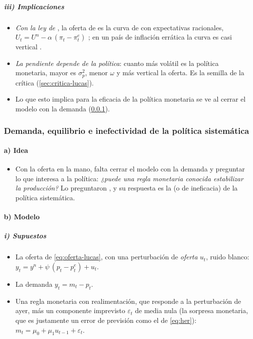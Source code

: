 \documentclass[11pt]{article}
\begin{document}
\subparagraph{iii) Implicaciones}

\begin{itemize}
\item \emph{Con la ley de }, la oferta de  es la curva de  con expectativas racionales, $U_t=U^n-\alpha\,(\pi_t-\pi^e_t)$ ; en un país de inflación errática la curva es casi vertical .
\item \emph{La pendiente depende de la política}: cuanto más volátil es la política monetaria, mayor es $\sigma^2_p$, menor $\omega$ y más vertical la oferta. Es la semilla de la crítica (\ref{sec:critica-lucas}).
\item Lo que esto implica para la eficacia de la política monetaria se ve al cerrar el modelo con la demanda (\ref{sec:inefectividad}).
\end{itemize}

\subsubsection{Demanda, equilibrio e inefectividad de la política sistemática}\label{sec:inefectividad}

\paragraph{a) Idea}

\begin{itemize}
\item Con la oferta en la mano, falta cerrar el modelo con la demanda y preguntar lo que interesa a la política: \emph{¿puede una regla monetaria conocida estabilizar la producción?} Lo preguntaron \textcite{SargentWallace1975Rational,SargentWallace1976Rational}, y su respuesta es la  (o de ineficacia) de la política sistemática.
\end{itemize}

\paragraph{b) Modelo}

\subparagraph{i) Supuestos}

\begin{itemize}
\item La oferta de  \eqref{eq:oferta-lucas}, con una perturbación de \emph{oferta} $u_t$, ruido blanco: $y_t=y^n+\psi\,(p_t-p^e_t)+u_t$.
\item La demanda $y_t=m_t-p_t$.
\item Una regla monetaria con realimentación, que responde a la perturbación de ayer, más un componente imprevisto $\varepsilon_t$ de media nula (la sorpresa monetaria, que es justamente un error de previsión como el de \eqref{eq:her}): $m_t=\mu_0+\mu_1u_{t-1}+\varepsilon_t$.
\end{itemize}
\end{document}

